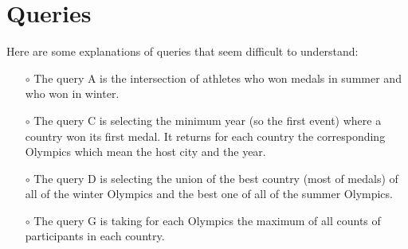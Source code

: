 %
%
%
%

\chapter{Queries}

Here are some explanations of queries that seem difficult to understand:
\begin{itemize}
	\item[$\circ$] The query A is the intersection of athletes who won medals in summer and who won in
	winter.
	\item[$\circ$] The query C is selecting the minimum year (so the first event) where a country won its
first medal. It returns for each country the corresponding Olympics which mean the host
city and the year.
	\item[$\circ$] The query D is selecting the union of the best country (most of medals) of all of the winter
Olympics and the best one of all of the summer Olympics.
	\item[$\circ$] The query G is taking for each Olympics the maximum of all counts of participants in
each country.
\end{itemize}

\begin{center}
	
\end{center}

\begin{center}
	
\end{center}

\begin{center}
	
\end{center}

\begin{center}
	
\end{center}

\begin{center}
	
\end{center}

\begin{center}
	
\end{center}

